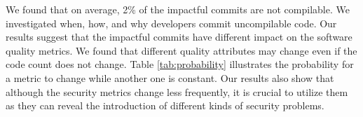 We found that on average, 2\% of the impactful  commits are  not compilable. We investigated when, how, and why developers commit uncompilable code. Our results suggest that the impactful commits have different impact on the software quality metrics. We found that different quality attributes may change even if the code count does not change.
Table \ref{tab:probability} illustrates the probability for a metric to change while another one is constant.
Our results also show that although the security metrics change less frequently, it is crucial to utilize them as they can reveal the introduction of different kinds of security problems.

\begin{table}[htbp]
	\centering
	\caption{$100 * |change(Y) \cap const(X)|/|const(X)|$}
	\label{tab:probability}%
	\vspace{-0.3cm}
\end{table}%

